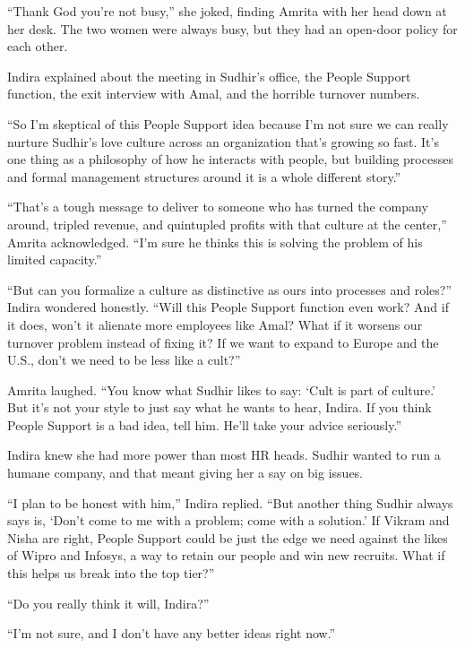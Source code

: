 \documentclass[10pt,a4paper]{book}
\begin{document}
\begin{multicols}{3}
{“Thank God you’re not busy,” she joked, finding Amrita with her head down at her desk. The two women were always busy, but they had an open-door policy for each other.

Indira explained about the meeting in Sudhir’s office, the People Support function, the exit interview with Amal, and the horrible turnover numbers.

“So I’m skeptical of this People Support idea because I’m not sure we can really nurture Sudhir’s love culture across an organization that’s growing so fast. It’s one thing as a philosophy of how he interacts with people, but building processes and formal management structures around it is a whole different story.”

“That’s a tough message to deliver to someone who has turned the company around, tripled revenue, and quintupled profits with that culture at the center,” Amrita acknowledged. “I’m sure he thinks this is solving the problem of his limited capacity.”

“But can you formalize a culture as distinctive as ours into processes and roles?” Indira wondered honestly. “Will this People Support function even work? And if it does, won’t it alienate more employees like Amal? What if it worsens our turnover problem instead of fixing it? If we want to expand to Europe and the U.S., don’t we need to be less like a cult?”

Amrita laughed. “You know what Sudhir likes to say: ‘Cult is part of culture.’ But it’s not your style to just say what he wants to hear, Indira. If you think People Support is a bad idea, tell him. He’ll take your advice seriously.”

Indira knew she had more power than most HR heads. Sudhir wanted to run a humane company, and that meant giving her a say on big issues.

“I plan to be honest with him,” Indira replied. “But another thing Sudhir always says is, ‘Don’t come to me with a problem; come with a solution.’ If Vikram and Nisha are right, People Support could be just the edge we need against the likes of Wipro and Infosys, a way to retain our people and win new recruits. What if this helps us break into the top tier?”

“Do you really think it will, Indira?”

“I’m not sure, and I don’t have any better ideas right now.”
}
\end{multicols} 
\vspace{1cm}
\end{document}

